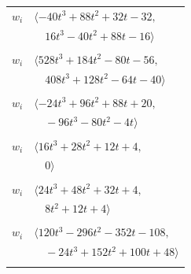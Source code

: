 \documentclass[11pt]{article}
\begin{document}
\begin{longtable}{@{}ll@{}}
$w_i$ & $\langle -40t^{3}+88t^{2}+32t-32,$\\
 & $\quad 16t^{3}-40t^{2}+88t-16\rangle$\\
\addlinespace[2pt]
\multicolumn{2}{@{}p{0.97\textwidth}@{}}{$i=50$, $D_i=4$, $\rho_{ij}$: $3{:}2, \allowbreak 5{:}1, \allowbreak 7{:}1, \allowbreak 21{:}2, \allowbreak 22{:}2, \allowbreak 28{:}1, \allowbreak 45{:}2, \allowbreak 48{:}1$}\\
$w_i$ & $\langle 528t^{3}+184t^{2}-80t-56,$\\
 & $\quad 408t^{3}+128t^{2}-64t-40\rangle$\\
\addlinespace[2pt]
\multicolumn{2}{@{}p{0.97\textwidth}@{}}{$i=51$, $D_i=4$, $\rho_{ij}$: $0{:}1, \allowbreak 10{:}2, \allowbreak 21{:}2, \allowbreak 28{:}1, \allowbreak 43{:}1, \allowbreak 45{:}2, \allowbreak 54{:}2, \allowbreak 57{:}1$}\\
$w_i$ & $\langle -24t^{3}+96t^{2}+88t+20,$\\
 & $\quad -96t^{3}-80t^{2}-4t\rangle$\\
\addlinespace[2pt]
\multicolumn{2}{@{}p{0.97\textwidth}@{}}{$i=52$, $D_i=4$, $\rho_{ij}$: $16{:}1, \allowbreak 17{:}1, \allowbreak 23{:}2, \allowbreak 42{:}1, \allowbreak 45{:}2, \allowbreak 48{:}2, \allowbreak 59{:}2$}\\
$w_i$ & $\langle 16t^{3}+28t^{2}+12t+4,$\\
 & $\quad 0\rangle$\\
\addlinespace[2pt]
\multicolumn{2}{@{}p{0.97\textwidth}@{}}{$i=53$, $D_i=4$, $\rho_{ij}$: $3{:}1, \allowbreak 21{:}2, \allowbreak 26{:}1, \allowbreak 37{:}1, \allowbreak 43{:}2, \allowbreak 59{:}1$}\\
$w_i$ & $\langle 24t^{3}+48t^{2}+32t+4,$\\
 & $\quad 8t^{2}+12t+4\rangle$\\
\addlinespace[2pt]
\multicolumn{2}{@{}p{0.97\textwidth}@{}}{$i=54$, $D_i=4$, $\rho_{ij}$: $0{:}2, \allowbreak 2{:}1, \allowbreak 4{:}2, \allowbreak 6{:}1, \allowbreak 31{:}1, \allowbreak 33{:}1, \allowbreak 40{:}2, \allowbreak 47{:}2, \allowbreak 51{:}1, \allowbreak 55{:}1, \allowbreak 58{:}1$}\\
$w_i$ & $\langle 120t^{3}-296t^{2}-352t-108,$\\
 & $\quad -24t^{3}+152t^{2}+100t+48\rangle$\\
\addlinespace[2pt]
\multicolumn{2}{@{}p{0.97\textwidth}@{}}{$i=55$, $D_i=4$, $\rho_{ij}$: $0{:}1, \allowbreak 13{:}2, \allowbreak 22{:}2, \allowbreak 23{:}2, \allowbreak 31{:}1, \allowbreak 34{:}1, \allowbreak 41{:}1, \allowbreak 54{:}2$}\\

\end{longtable}
\end{document}
